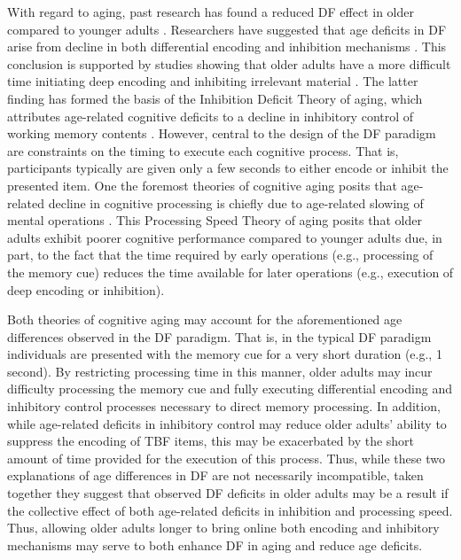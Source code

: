\documentclass[man]{apa6}
\begin{document}
With regard to aging, past research has found a reduced DF effect in older compared to younger adults \parencite{andres.vanderlinden.parmentier2004,collette.et.al.2009,dulaney.marks.link2004,earles.kersten2002,feyereisen.charot2008,gamboz.russo2002,hasher.zacks.rahhal1999,hogge.adam.collette2008,lustig.hasher.zacks2007,sego.golding.gottlob2006} \parencite[see][for meta-analysis and review]{zachs.hasher1994,zacks.radvansky.hasher1996,titz.verhaeghen2010}. Researchers have suggested that age deficits in DF arise from decline in both differential encoding and inhibition mechanisms \parencite{zacks.radvansky.hasher1996, zacks.hasher.li2000, hogge.adam.collette2008}. This conclusion is supported by studies showing that older adults have a more difficult time initiating deep encoding \parencite[for review, see]{craik.rose2012} and inhibiting irrelevant material \parencite[e.g.,]{troyer.leach.strauss2006, lawo.et.al.2012}. The latter finding has formed the basis of the Inhibition Deficit Theory of aging, which attributes age-related cognitive deficits to a decline in inhibitory control of working memory contents \parencite{hasher.zacks1988,zacks.hasher.li2000}. However, central to the design of the DF paradigm are constraints on the timing to execute each cognitive process. That is, participants typically are given only a few seconds to either encode or inhibit the presented item. One the foremost theories of cognitive aging posits that age-related decline in cognitive processing is chiefly due to age-related slowing of mental operations \parencite{salthouse1996}. This Processing Speed Theory of aging posits that older adults exhibit poorer cognitive performance compared to younger adults due, in part, to the fact that the time required by early operations (e.g., processing of the memory cue) reduces the time available for later operations (e.g., execution of deep encoding or inhibition).

Both theories of cognitive aging may account for the aforementioned age differences observed in the DF paradigm. That is, in the typical DF paradigm individuals are presented with the memory cue for a very short duration (e.g., 1 second). By restricting processing time in this manner, older adults may incur difficulty processing the memory cue and fully executing differential encoding and inhibitory control processes necessary to direct memory processing. In addition, while age-related deficits in inhibitory control may reduce older adults’ ability to suppress the encoding of TBF items, this may be exacerbated by the short amount of time provided for the execution of this process. Thus, while these two explanations of age differences in DF are not necessarily incompatible, taken together they suggest that observed DF deficits in older adults may be a result if the collective effect of both age-related deficits in inhibition and processing speed. Thus, allowing older adults longer to bring online both encoding and inhibitory mechanisms may serve to both enhance DF in aging and reduce age deficits.
\end{document}

